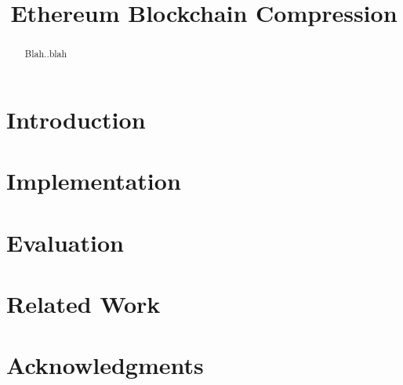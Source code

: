 \documentclass[10pt,numbers]{sigplanconf}
\theoremstyle{definition}
\begin{document}
\allowdisplaybreaks[1]





\title{Ethereum Blockchain Compression}
\maketitle
\begin{abstract}
Blah..blah
\end{abstract}



\section{Introduction} \label{sec:intro}





\section{Implementation}\label{sec:implement}


\section{Evaluation}\label{sec:evaluation}


\section{Related Work} \label{sec:related}



\section*{Acknowledgments}




\appendix
\end{document}
